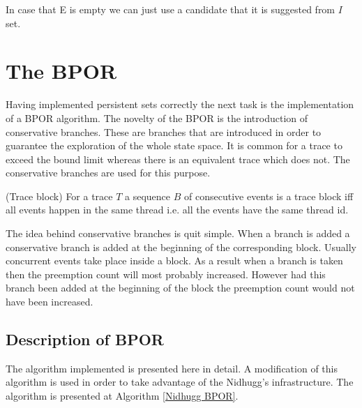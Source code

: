 In case that E is empty we can just use a candidate that it is suggested from $I$ set.

\section{The BPOR}
Having implemented persistent sets correctly the next task is the implementation of a BPOR algorithm. The novelty of the BPOR is the introduction of conservative branches. These
are branches that are introduced in order to guarantee the exploration of the whole state space. It is common for a trace to exceed the bound limit whereas there is
an equivalent trace which does not. The conservative branches are used for this purpose.

\begin{definition}{(Trace block)}
For a trace $T$ a sequence $B$ of consecutive events is a trace block iff all events happen in the same thread i.e. all the events have the same thread id.
\end{definition}

The idea behind conservative branches is quit simple. When a branch is added a conservative branch is added at the beginning of the corresponding block.
Usually concurrent events take place inside a block. As a result when a branch is taken then the preemption count will most probably increased. However had this
branch been added at the beginning of the block the preemption count would not have been increased. 

\subsection{Description of BPOR}
The algorithm implemented is presented here \cite{BPOR} in detail. A modification of this algorithm is used in order to take advantage of the Nidhugg's infrastructure.
The algorithm is presented at Algorithm \ref{Nidhugg BPOR}.


